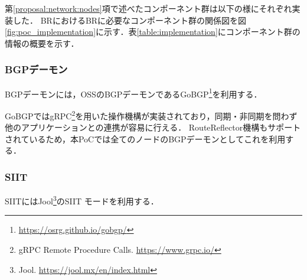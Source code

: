 \begin{table}[]
    \label{table:implementation}
    \caption{PoCの実装に利用したソフトウェア群}
\end{table}

第\ref{proposal:network:nodes}項で述べたコンポーネント群は以下の様にそれぞれ実装した．
BRにおけるBRに必要なコンポーネント群の関係図を図\ref{fig:poc_implementation}に示す．表\ref{table:implementation}にコンポーネント群の情報の概要を示す．


\subsubsection{BGPデーモン}
BGPデーモンには，OSSのBGPデーモンであるGoBGP\footnote{\url{https://osrg.github.io/gobgp/}}を利用する．

GoBGPではgRPC\footnote{gRPC Remote Procedure Calls. \url{https://www.grpc.io/}}を用いた操作機構が実装されており，同期・非同期を問わず他のアプリケーションとの連携が容易に行える．
RouteReflector機構もサポートされているため，本PoCでは全てのノードのBGPデーモンとしてこれを利用する．

\subsubsection{SIIT}
SIITにはJool\footnote{Jool. \url{https://jool.mx/en/index.html}}のSIIT モードを利用する．

